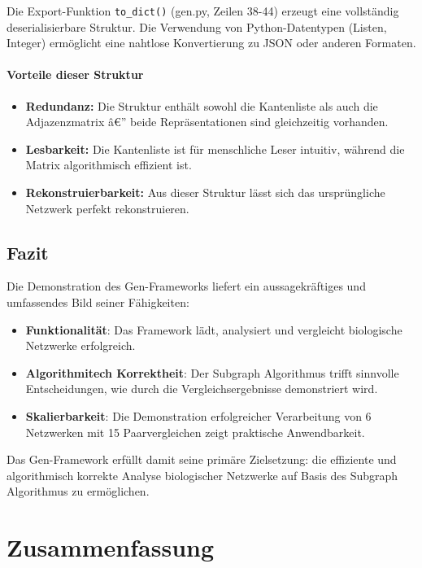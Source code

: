﻿\documentclass[a4paper,12pt]{article}
\theoremstyle{definition}
\begin{document}
Die Export-Funktion \texttt{to\_dict()} (gen.py, Zeilen 38-44) erzeugt eine vollständig deserialisierbare Struktur. Die Verwendung von Python-Datentypen (Listen, Integer) ermöglicht eine nahtlose Konvertierung zu JSON oder anderen Formaten.

\paragraph{Vorteile dieser Struktur}
\begin{itemize}
\item[-] \textbf{Redundanz:} Die Struktur enthält sowohl die Kantenliste als auch die Adjazenzmatrix â€” beide Repräsentationen sind gleichzeitig vorhanden.
\item[-] \textbf{Lesbarkeit:} Die Kantenliste ist für menschliche Leser intuitiv, während die Matrix algorithmisch effizient ist.
\item[-] \textbf{Rekonstruierbarkeit:} Aus dieser Struktur lässt sich das ursprüngliche Netzwerk perfekt rekonstruieren.
\end{itemize}

\subsection{Fazit}

Die Demonstration des Gen-Frameworks liefert ein aussagekräftiges und umfassendes Bild seiner Fähigkeiten:

\begin{itemize}
\item[-] \textbf{Funktionalität}: Das Framework lädt, analysiert und vergleicht biologische Netzwerke erfolgreich.
\item[-] \textbf{Algorithmitech Korrektheit}: Der Subgraph Algorithmus trifft sinnvolle Entscheidungen, wie durch die Vergleichsergebnisse demonstriert wird.
\item[-] \textbf{Skalierbarkeit}: Die Demonstration erfolgreicher Verarbeitung von 6 Netzwerken mit 15 Paarvergleichen zeigt praktische Anwendbarkeit.
\end{itemize}

Das Gen-Framework erfüllt damit seine primäre Zielsetzung: die effiziente und algorithmisch korrekte Analyse biologischer Netzwerke auf Basis des Subgraph Algorithmus zu ermöglichen.

\section{Zusammenfassung}
\end{document}
